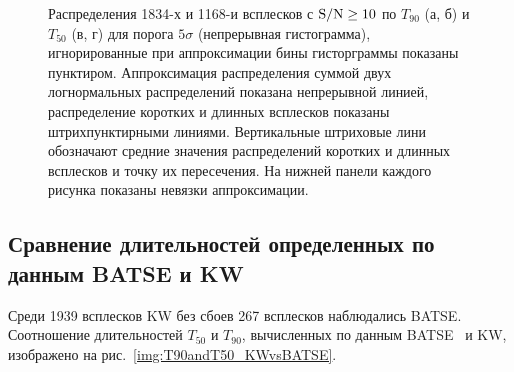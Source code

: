 \begin{figure}[h]
  \begin{minipage}[h]{0.5\textwidth}
  \end{minipage}
  \hfill
  \begin{minipage}[h]{0.5\textwidth}
  \end{minipage}
  \vfill
  \begin{minipage}[h]{0.5\textwidth}
  \end{minipage}
  \hfill
  \begin{minipage}[h]{0.5\textwidth}
  \end{minipage}
  \caption[Распределения 1834-х и 1168-и всплесков с $\rmn{S/N}\geq 10$ по $T_{90}$ и~$T_{50}$]
  {Распределения 1834-х и 1168-и всплесков с $\rmn{S/N}\geq 10$ по $T_{90}$ (а, б) и 
  $T_{50}$ (в, г) для порога $5\sigma$ (непрерывная гистограмма), 
  игнорированные при аппроксимации бины гисторграммы показаны пунктиром. 
  Аппроксимация распределения суммой двух логнормальных распределений  показана 
  непрерывной линией, распределение коротких и длинных всплесков показаны 
  штрихпунктирными линиями.  Вертикальные штриховые лини обозначают средние значения 
  распределений коротких и длинных всплесков и точку их пересечения. 
  На нижней панели каждого рисунка показаны невязки аппроксимации.}
  \label{img:T90andT50s5}  
\end{figure}

\begin{landscape}

\end{landscape}

\subsection{Сравнение длительностей определенных по данным BATSE и KW}
Среди 1939 всплесков KW без сбоев 267 всплесков наблюдались BATSE. 
Соотношение длительностей $T_{50}$ и $T_{90}$, вычисленных по данным BATSE~\citep{Paciesas_1999} 
и KW, изображено на рис.~\ref{img:T90andT50_KWvsBATSE}.

